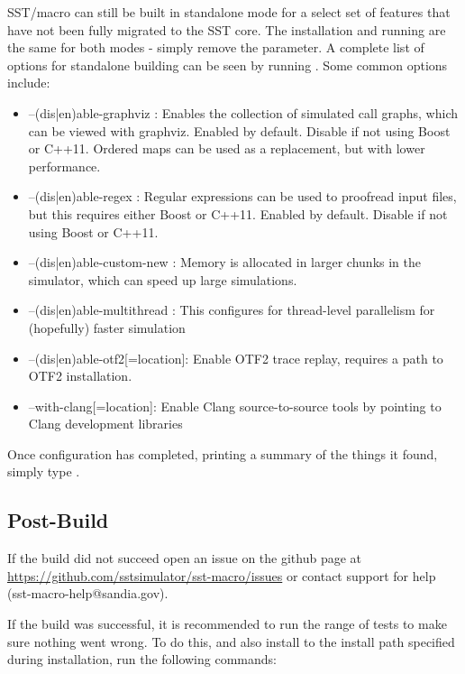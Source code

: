 SST/macro can still be built in standalone mode for a select set of features that have not been fully migrated to the SST core.  
The installation and running are the same for both modes - simply remove the  parameter.  
A complete list of options for standalone building can be seen by running .   Some common options include:

\begin{itemize}
\item --(dis|en)able-graphviz : Enables the collection of simulated call graphs, which can be viewed with graphviz.
Enabled by default. Disable if not using Boost or C++11. Ordered maps can be used as a replacement, but with lower performance.
\item --(dis|en)able-regex : Regular expressions can be used to proofread input files, but this requires either Boost or C++11.
Enabled by default. Disable if not using Boost or C++11.
\item --(dis|en)able-custom-new : Memory is allocated in larger chunks in the simulator, which can speed up large simulations.
\item --(dis|en)able-multithread : This configures for thread-level parallelism for (hopefully) faster simulation
\item --(dis|en)able-otf2[=location]: Enable OTF2 trace replay, requires a path to OTF2 installation.
\item --with-clang[=location]: Enable Clang source-to-source tools by pointing to Clang development libraries
\end{itemize}

Once configuration has completed, printing a summary of the things it found, simply type .  

\subsection{Post-Build}
\label{subsec:postbuild}

If the build did not succeed open an issue on the github page at \url{https://github.com/sstsimulator/sst-macro/issues} or contact \sstmacro support for help (sst-macro-help@sandia.gov).

If the build was successful, it is recommended to run the range of tests to make sure nothing went wrong.  
To do this, and also install \sstmacro  to the install path specified during installation, run the following commands:

